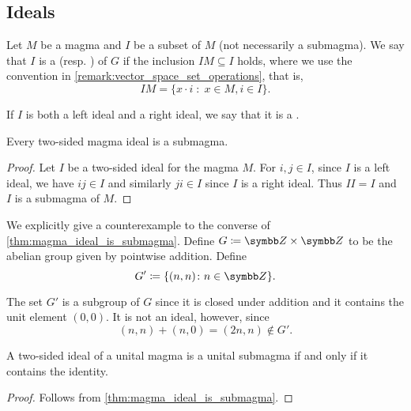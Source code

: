 \subsection{Ideals}\label{subsec:ideals}

\begin{definition}\label{def:magma_ideal}
  Let \( M \) be a magma and \( I \) be a subset of \( M \) (not necessarily a submagma). We say that \( I \) is a  (resp. ) of \( G \) if the inclusion \( IM \subseteq I \) holds, where we use the convention in \cref{remark:vector_space_set_operations}, that is,
  \begin{equation*}
    IM = \{ x \cdot i \;\colon\; x \in M, i \in I \}.
  \end{equation*}

  If \( I \) is both a left ideal and a right ideal, we say that it is a .
\end{definition}

\begin{proposition}\label{thm:magma_ideal_is_submagma}
  Every two-sided magma ideal is a submagma.
\end{proposition}
\begin{proof}
  Let \( I \) be a two-sided ideal for the magma \( M \). For \( i, j \in I \), since \( I \) is a left ideal, we have \( ij \in I \) and similarly \( ji \in I \) since \( I \) is a right ideal. Thus \( II = I \) and \( I \) is a submagma of \( M \).
\end{proof}

\begin{example}\label{ex:subgroup_is_not_ideal}
  We explicitly give a counterexample to the converse of \cref{thm:magma_ideal_is_submagma}. Define \( G \coloneqq \Z \times \Z \) to be the abelian group given by pointwise addition. Define
  \begin{equation*}
    G' \coloneqq \{ (n, n) \colon n \in \Z \}.
  \end{equation*}

  The set \( G' \) is a subgroup of \( G \) since it is closed under addition and it contains the unit element \( (0, 0) \). It is not an ideal, however, since
  \begin{equation*}
    (n, n) + (n, 0) = (2n, n) \not\in G'.
  \end{equation*}
\end{example}

\begin{proposition}\label{thm:unital_magma_ideal_is_submagma_iff_contains_identity}
  A two-sided ideal of a unital magma is a unital submagma if and only if it contains the identity.
\end{proposition}
\begin{proof}
  Follows from \cref{thm:magma_ideal_is_submagma}.
\end{proof}

